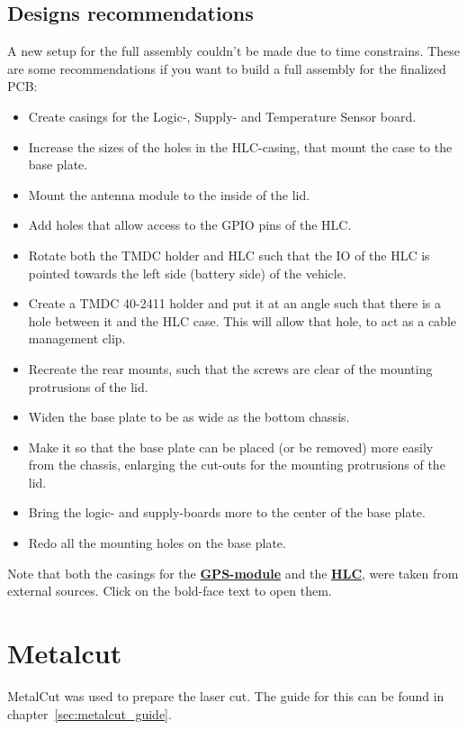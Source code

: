 \documentclass[ti,oneside,10pt]{uantwerpenreport}
\begin{document}
\subsection{Designs recommendations}
A new setup for the full assembly couldn't be made due to time constrains.
These are some recommendations if you want to build a full assembly for the finalized PCB:
\begin{itemize}
    \item Create casings for the Logic-, Supply- and Temperature Sensor board.
    \item Increase the sizes of the holes in the HLC-casing, that mount the case to the base plate.
    \item Mount the antenna module to the inside of the lid.
    \item Add holes that allow access to the GPIO pins of the HLC.
    \item Rotate both the TMDC holder and HLC such that the IO of the HLC is pointed towards the left side (battery side) of the vehicle.
    \item Create a TMDC 40-2411 holder and put it at an angle such that there is a hole between it and the HLC case.
          This will allow that hole, to act as a cable management clip.
    \item Recreate the rear mounts, such that the screws are clear of the mounting protrusions of the lid.
    \item Widen the base plate to be as wide as the bottom chassis.
    \item Make it so that the base plate can be placed (or be removed) more easily from the chassis, enlarging the cut-outs for the mounting protrusions of the lid.
    \item Bring the logic- and supply-boards more to the center of the base plate.
    \item Redo all the mounting holes on the base plate.
\end{itemize}

Note that both the casings for the \textbf{\href{https://www.printables.com/model/548510-gps-gy-gps6mv2-module-case-neo-6m}{GPS-module}} and the \textbf{\href{https://www.treatstock.com/blog/3d-printed-cases-for-nvidia-jetson-nano}{HLC}}, were taken from external sources.
Click on the bold-face text to open them.
\section{Metalcut}
MetalCut was used to prepare the laser cut.
The guide for this can be found in chapter~\ref{sec:metalcut_guide}.
\end{document}
